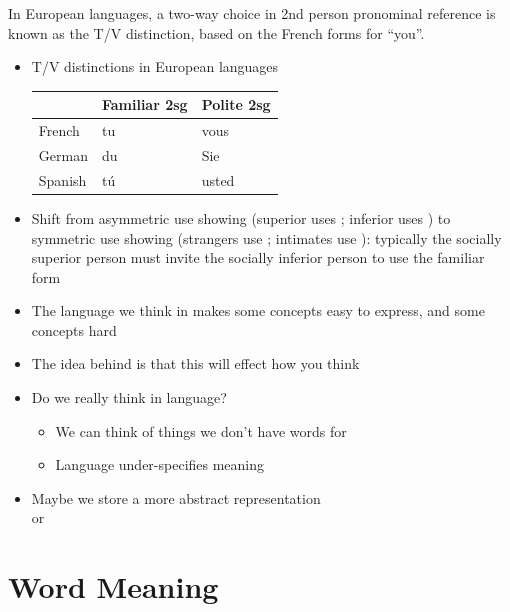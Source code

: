 \documentclass[headrule,footrule]{foils}
\begin{document}

In European languages, a two-way choice in 2nd person pronominal
reference is known as the T/V distinction, based on the French forms
for ``you''.

\begin{itemize}
\item T/V distinctions in European languages
\\[2ex]  \begin{tabular}{lll}
    & Familiar 2sg & Polite 2sg \\ \hline
    French & tu & vous \\
    German & du & Sie \\
    Spanish & t\'u & usted
  \end{tabular}

\item Shift from asymmetric use showing  (superior uses ; inferior uses ) to symmetric use showing  (strangers use  ; intimates use ): typically the socially superior person must invite the socially
  inferior person to use the familiar form
\end{itemize}






\begin{itemize}
\item The language we think in makes some concepts easy to express,
  and some concepts hard
\item The idea behind  is that this will
  effect how you think
\item Do we really think in language? 
  \begin{itemize}
  \item We can think of things we don't have words for
  \item Language under-specifies meaning
  \end{itemize}
\item Maybe we store a more abstract representation
\\  or 
\end{itemize}

\section{Word Meaning}
\end{document}

